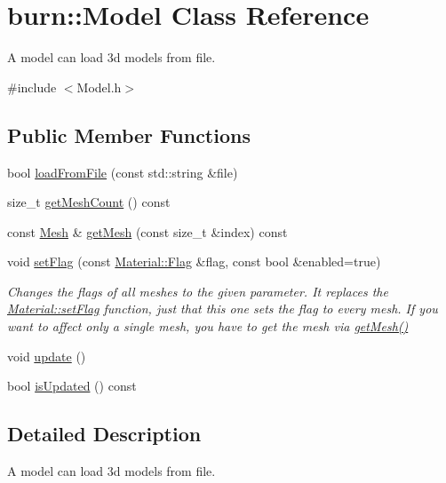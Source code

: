 \hypertarget{classburn_1_1_model}{\section{burn\-:\-:Model Class Reference}
\label{classburn_1_1_model}
}


A model can load 3d models from file.  




{\ttfamily \#include $<$Model.\-h$>$}

\subsection*{Public Member Functions}
\begin{DoxyCompactItemize}
\item 
bool \hyperlink{classburn_1_1_model_aa9220fbb6658d0ded238efd5f5e81097}{load\-From\-File} (const std\-::string \&file)
\item 
size\-\_\-t \hyperlink{classburn_1_1_model_a25e8e13b43f76cb7336a8dafbebcbc44}{get\-Mesh\-Count} () const 
\item 
const \hyperlink{classburn_1_1_mesh}{Mesh} \& \hyperlink{classburn_1_1_model_a137c8036e620ceb11cb6459edbe33178}{get\-Mesh} (const size\-\_\-t \&index) const 
\item 
void \hyperlink{classburn_1_1_model_ac685b9312e2fbc837142d66949c8056f}{set\-Flag} (const \hyperlink{classburn_1_1_material_a704108f8bb133e1911495b84bd0826b8}{Material\-::\-Flag} \&flag, const bool \&enabled=true)
\begin{DoxyCompactList}\small\item\em Changes the flags of all meshes to the given parameter. It replaces the \hyperlink{classburn_1_1_material_a833037afe81bc0aa52ceb4581b66087f}{Material\-::set\-Flag} function, just that this one sets the flag to every mesh. If you want to affect only a single mesh, you have to get the mesh via \hyperlink{classburn_1_1_model_a137c8036e620ceb11cb6459edbe33178}{get\-Mesh()} \end{DoxyCompactList}\item 
void \hyperlink{classburn_1_1_model_a9f9a12b843e91110ac500d23fd33a46c}{update} ()
\item 
bool \hyperlink{classburn_1_1_model_a005e0dfee9c82744f2ac7416eeb84905}{is\-Updated} () const 
\end{DoxyCompactItemize}


\subsection{Detailed Description}
A model can load 3d models from file. 

